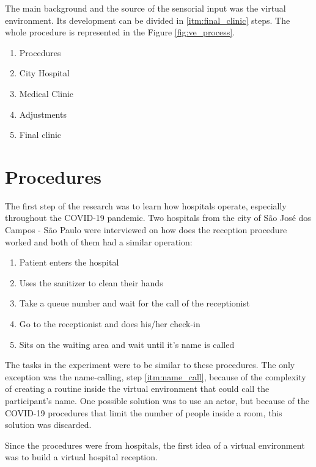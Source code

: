 
The main background and the source of the sensorial input was the virtual environment. Its development can be divided in \ref{itm:final_clinic} steps. The whole procedure is represented in the Figure \ref{fig:ve_process}.

\begin{enumerate}
    \item Procedures
    \item City Hospital
    \item Medical Clinic
    \item Adjustments
    \item Final clinic \label{itm:final_clinic}
\end{enumerate}



\section{Procedures}

    The first step of the research was to learn how hospitals operate, especially throughout the COVID-19 pandemic. Two hospitals from the city of São José dos Campos - São Paulo were interviewed on how does the reception procedure worked and both of them had a similar operation:
    
    \begin{enumerate}
        \item Patient enters the hospital
        \item Uses the sanitizer to clean their hands
        \item Take a queue number and wait for the call of the receptionist
        \item Go to the receptionist and does his/her check-in
        \item Sits on the waiting area and wait until it's name is called \label{itm:name_call}
    \end{enumerate}
    
    The tasks in the experiment were to be similar to these procedures. The only exception was the name-calling, step \ref{itm:name_call}, because of the complexity of creating a routine inside the virtual environment that could call the participant's name. One possible solution was to use an actor, but because of the COVID-19 procedures that limit the number of people inside a room, this solution was discarded.
    
    Since the procedures were from hospitals, the first idea of a virtual environment was to build a virtual hospital reception.

